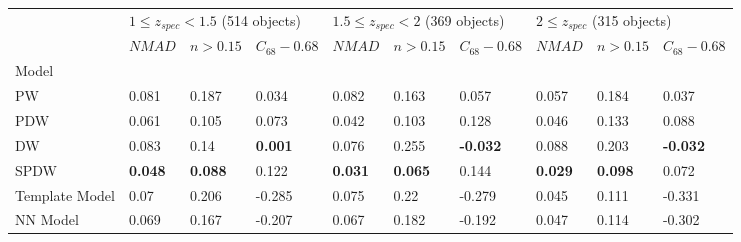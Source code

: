 \documentclass[fleqn,usenatbib]{mnras}
\begin{document}
\begin{table}
	\begin{tabular}{llllllllll}
            \hline
            {} & \multicolumn{3}{l}{$1 \leq z_{spec} < 1.5$ (514 objects)} & \multicolumn{3}{l}{$1.5 \leq z_{spec} < 2$ (369 objects)} & \multicolumn{3}{l}{$2 \leq z_{spec}$ (315 objects)} \\
            {} &                                $NMAD$ &        $n>0.15$ & $C_{68} - 0.68$ &                                $NMAD$ &        $n>0.15$ &  $C_{68} - 0.68$ &                          $NMAD$ &        $n>0.15$ &  $C_{68} - 0.68$ \\
            Model          &                                       &                 &                 &                                       &                 &                  &                                 &                 &                  \\
            \hline
            PW             &                                 0.081 &           0.187 &           0.034 &                                 0.082 &           0.163 &            0.057 &                           0.057 &           0.184 &            0.037 \\
            PDW            &                                 0.061 &           0.105 &           0.073 &                                 0.042 &           0.103 &            0.128 &                           0.046 &           0.133 &            0.088 \\
            DW             &                                 0.083 &            0.14 &  \textbf{0.001} &                                 0.076 &           0.255 &  \textbf{-0.032} &                           0.088 &           0.203 &  \textbf{-0.032} \\
            SPDW           &                        \textbf{0.048} &  \textbf{0.088} &           0.122 &                        \textbf{0.031} &  \textbf{0.065} &            0.144 &                  \textbf{0.029} &  \textbf{0.098} &            0.072 \\
            Template Model &                                  0.07 &           0.206 &          -0.285 &                                 0.075 &            0.22 &           -0.279 &                           0.045 &           0.111 &           -0.331 \\
            NN Model       &                                 0.069 &           0.167 &          -0.207 &                                 0.067 &           0.182 &           -0.192 &                           0.047 &           0.114 &           -0.302 \\

\end{tabular}
\end{table}
\end{document}
